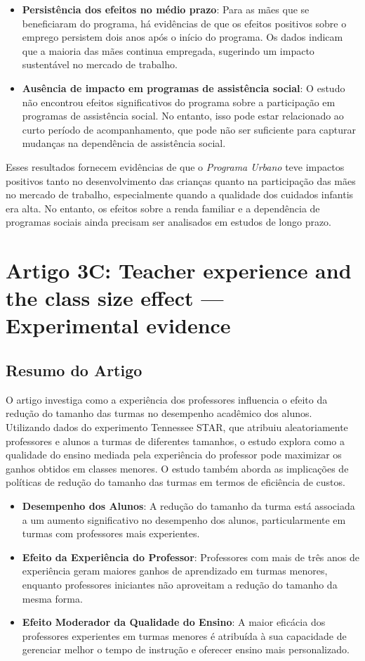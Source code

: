 \documentclass[a4paper,12pt]{article}[abntex2]
\begin{document}
\begin{itemize}
    \item \textbf{Persistência dos efeitos no médio prazo}: Para as mães que se beneficiaram do programa, há evidências de que os efeitos positivos sobre o emprego persistem dois anos após o início do programa. Os dados indicam que a maioria das mães continua empregada, sugerindo um impacto sustentável no mercado de trabalho.
    
    \item \textbf{Ausência de impacto em programas de assistência social}: O estudo não encontrou efeitos significativos do programa sobre a participação em programas de assistência social. No entanto, isso pode estar relacionado ao curto período de acompanhamento, que pode não ser suficiente para capturar mudanças na dependência de assistência social.
\end{itemize}

Esses resultados fornecem evidências de que o \textit{Programa Urbano} teve impactos positivos tanto no desenvolvimento das crianças quanto na participação das mães no mercado de trabalho, especialmente quando a qualidade dos cuidados infantis era alta. No entanto, os efeitos sobre a renda familiar e a dependência de programas sociais ainda precisam ser analisados em estudos de longo prazo.

\newpage
\section{\textbf{Artigo 3C: Teacher experience and the class size effect — Experimental evidence}}

\subsection{\textbf{Resumo do Artigo}}
O artigo investiga como a experiência dos professores influencia o efeito da redução do tamanho das turmas no desempenho acadêmico dos alunos. Utilizando dados do experimento Tennessee STAR, que atribuiu aleatoriamente professores e alunos a turmas de diferentes tamanhos, o estudo explora como a qualidade do ensino mediada pela experiência do professor pode maximizar os ganhos obtidos em classes menores. O estudo também aborda as implicações de políticas de redução do tamanho das turmas em termos de eficiência de custos.

\begin{itemize}
    \item \textbf{Desempenho dos Alunos}: A redução do tamanho da turma está associada a um aumento significativo no desempenho dos alunos, particularmente em turmas com professores mais experientes.
    \item \textbf{Efeito da Experiência do Professor}: Professores com mais de três anos de experiência geram maiores ganhos de aprendizado em turmas menores, enquanto professores iniciantes não aproveitam a redução do tamanho da mesma forma.
    \item \textbf{Efeito Moderador da Qualidade do Ensino}: A maior eficácia dos professores experientes em turmas menores é atribuída à sua capacidade de gerenciar melhor o tempo de instrução e oferecer ensino mais personalizado.
\end{itemize}
\end{document}
